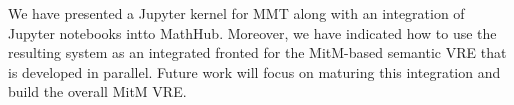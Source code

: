 
We have presented a Jupyter kernel for MMT along with an integration of Jupyter notebooks intto MathHub.
Moreover, we have indicated how to use the resulting system as an integrated fronted for the MitM-based semantic VRE that is developed in parallel. 
Future work will focus on maturing this integration and build the overall MitM VRE.

